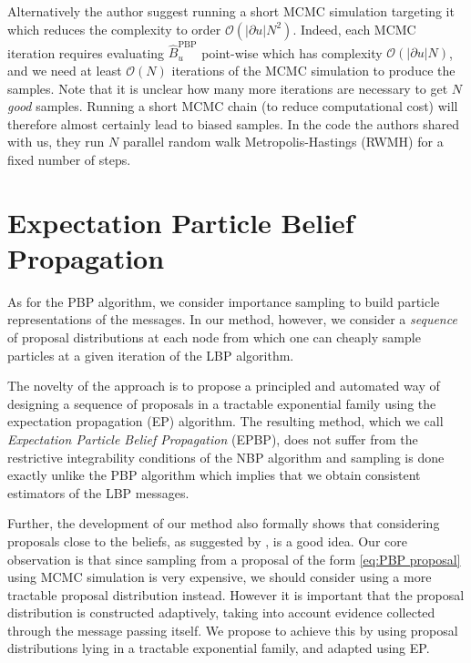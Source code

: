 Alternatively the author suggest running a short MCMC simulation targeting it which reduces the complexity to order $\mathcal O {(|\partial {u}|N^{2})}$. Indeed, each MCMC iteration requires evaluating $\widehat B_{u}^{\text{PBP}}$ point-wise which has complexity $\mathcal O {(|\partial{u}|N)}$, and we need at least $\mathcal{O}(N)$ iterations of the MCMC simulation to produce the samples. Note that it is unclear how many more iterations are necessary to get $N$ \emph{good} samples. Running a short MCMC chain (to reduce computational cost) will therefore almost certainly lead to biased samples. In the code the authors shared with us, they run $N$ parallel random walk Metropolis-Hastings (RWMH) for a fixed number of steps. 


\section{Expectation Particle Belief Propagation}
As for the PBP algorithm, we consider importance sampling to build particle representations of the messages. In our method, however, we consider a \emph{sequence} of proposal distributions at each node from which one can cheaply sample particles at a given iteration of the LBP algorithm. 

The novelty of the approach is to propose a principled and automated way of designing a sequence of proposals in a tractable exponential family using the expectation propagation (EP) algorithm. The resulting method, which we call \emph{Expectation Particle Belief Propagation} (EPBP), does not suffer from the restrictive integrability conditions of the NBP algorithm and sampling is done exactly unlike the PBP algorithm which implies that we obtain consistent estimators of the LBP messages.

Further, the development of our method also formally shows that considering proposals close to the beliefs, as suggested by \cite{ihler09}, is a good idea.  Our core observation is that since sampling from a proposal of the form \eqref{eq:PBP proposal} using MCMC simulation is very expensive, we should consider using a more tractable proposal distribution instead. However it is important that the proposal distribution is constructed adaptively, taking into account evidence collected through the message passing itself. We propose to achieve this by using proposal distributions lying in a tractable exponential family, and adapted using EP.

